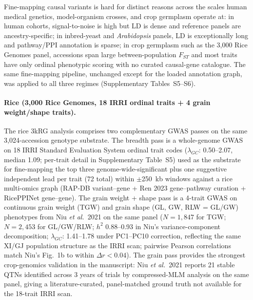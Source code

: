 Fine-mapping causal variants is hard for distinct reasons across the
scales human medical genetics, model-organism crosses, and crop
germplasm operate at: in human cohorts, signal-to-noise is high but
LD is dense and reference panels are ancestry-specific; in
inbred-yeast and \emph{Arabidopsis} panels, LD is exceptionally long
and pathway/PPI annotation is sparse; in crop germplasm such as the
3{,}000 Rice Genomes panel, accessions span large between-population
$F_{ST}$ and most traits have only ordinal phenotypic scoring with
no curated causal-gene catalogue. The same fine-mapping pipeline,
unchanged except for the loaded annotation graph, was applied to all
three regimes (Supplementary Tables~S5--S6).

\paragraph{Rice (3{,}000 Rice Genomes, 18 IRRI ordinal traits + 4 grain weight/shape traits).}
The rice 3kRG analysis comprises two complementary GWAS passes on
the same 3{,}024-accession genotype substrate. The breadth pass is
a whole-genome GWAS on 18 IRRI Standard Evaluation System ordinal
trait codes\cite{wang2018genomic} ($\lambda_{GC}$: 0.50--2.07,
median 1.09; per-trait detail in Supplementary Table~S5) used as
the substrate for fine-mapping the top three genome-wide-significant
plus one suggestive independent lead per trait (72 total) within
$\pm$250~kb windows against a rice multi-omics graph (RAP-DB
variant--gene + Ren 2023 gene--pathway curation\cite{ren2023rice}
+ RicePPINet gene--gene\cite{liu2017riceppinet}). The grain
weight + shape pass is a 4-trait GWAS on continuous grain weight
(TGW) and grain shape
(GL, GW, RLW = GL/GW) phenotypes from Niu \emph{et al.}\ 2021
\cite{niu2021grain} on the same panel ($N{=}1{,}847$ for TGW;
$N{=}2{,}453$ for GL/GW/RLW; $h^2$ 0.88--0.93 in Niu's
variance-component decomposition; $\lambda_{GC}$: 1.41--1.78 under
PC1--PC10 correction, reflecting the same XI/GJ population
structure as the IRRI scan; pairwise Pearson correlations match
Niu's Fig.~1b to within $\Delta r{<}0.04$). The grain pass provides
the strongest crop-genomics validation in the manuscript: Niu
\emph{et al.}\ 2021 reports 21 stable QTNs identified across 3
years of trials by compressed-MLM analysis on the same panel,
giving a literature-curated, panel-matched ground truth not
available for the 18-trait IRRI scan.

